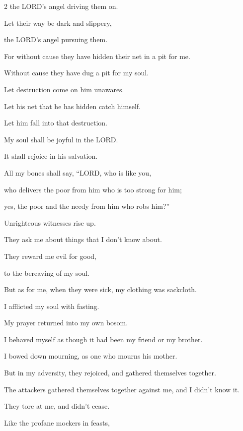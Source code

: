 \begin{multicols}{2}
	the LORD’s angel driving them on.
	
	
	\myverse{}Let their way be dark and slippery,
	
	the LORD’s angel pursuing them.
	
	
	\myverse{}For without cause they have hidden their net in a pit for me.
	
	Without cause they have dug a pit for my soul.
	
	
	\myverse{}Let destruction come on him unawares.
	
	Let his net that he has hidden catch himself.
	
	Let him fall into that destruction.
	
	\vspace{\baselineskip}
	
	\myverse{}My soul shall be joyful in the LORD.
	
	It shall rejoice in his salvation.
	
	
	\myverse{}All my bones shall say, “LORD, who is like you,
	
	who delivers the poor from him who is too strong for him;
	
	yes, the poor and the needy from him who robs him?”
	
	
	\myverse{}Unrighteous witnesses rise up.
	
	They ask me about things that I don’t know about.
	
	
	\myverse{}They reward me evil for good,
	
	to the bereaving of my soul.
	
	\vspace{\baselineskip}
	
	\myverse{}But as for me, when they were sick, my clothing was sackcloth.
	
	I afflicted my soul with fasting.
	
	My prayer returned into my own bosom.
	
	
	\myverse{}I behaved myself as though it had been my friend or my brother.
	
	I bowed down mourning, as one who mourns his mother.
	
	
	\myverse{}But in my adversity, they rejoiced, and gathered themselves
	together.
	
	The attackers gathered themselves together against me, and I didn’t know it.
	
	They tore at me, and didn’t cease.
	
	
	\myverse{}Like the profane mockers in feasts,
	

\end{multicols}
